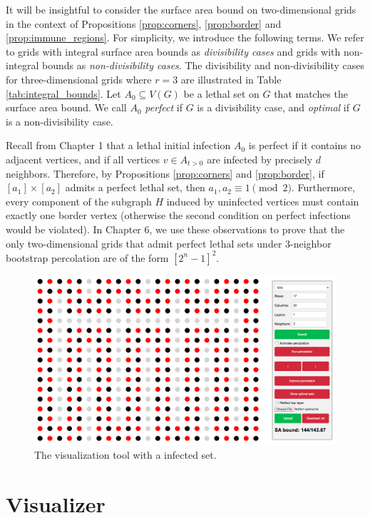 It will be insightful to consider the surface area bound on two-dimensional grids in the context of Propositions \ref{prop:corners}, \ref{prop:border} and \ref{prop:immune_regions}. For simplicity, we introduce the following terms. We refer to grids with integral surface area bounds as \emph{divisibility cases} and grids with non-integral bounds as \emph{non-divisibility cases}. The divisibility and non-divisibility cases for three-dimensional grids where $r=3$ are illustrated in Table \ref{tab:integral_bounds}. Let $A_0 \subseteq V(G)$ be a lethal set on $G$ that matches the surface area bound. We call $A_0$ \emph{perfect} if $G$ is a divisibility case, and \emph{optimal} if $G$ is a non-divisibility case. 

Recall from Chapter 1 that a lethal initial infection $A_0$ is perfect if it contains no adjacent vertices, and if all vertices $v \in A_{t > 0}$ are infected by precisely $d$ neighbors. Therefore, by Propositions \ref{prop:corners} and \ref{prop:border}, if  $[a_1] \times [a_2]$ admits a perfect lethal set, then $a_1, a_2 \equiv 1 \pmod 2$. Furthermore, every component of the subgraph $H$ induced by uninfected vertices must contain exactly one border vertex (otherwise the second condition on perfect infections would be violated). In Chapter 6, we use these observations to prove that the only two-dimensional grids that admit perfect lethal sets under 3-neighbor bootstrap percolation are of the form $[2^n-1]^2$.

\begin{figure}[]
\centering
\includegraphics[width=\textwidth]{figures/2/visualizer}
\caption{The visualization tool with a infected set.}
\label{fig:visualizer}
\end{figure} 

\section{Visualizer}

